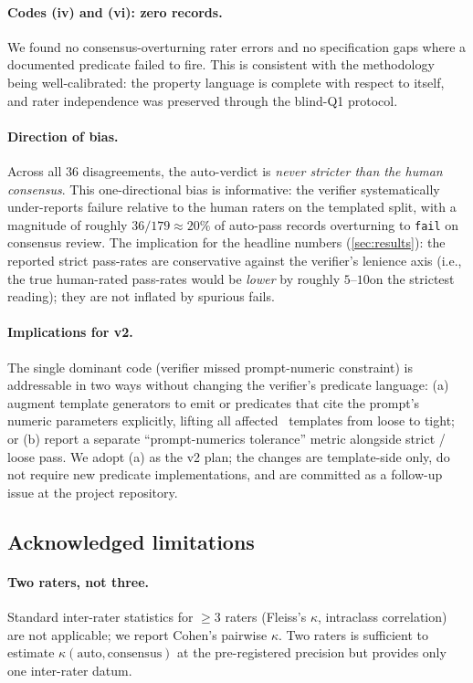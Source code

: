 \paragraph{Codes (iv) and (vi): zero records.}
We found no consensus-overturning rater errors and no specification gaps where a documented predicate failed to fire.
This is consistent with the methodology being well-calibrated: the property language is complete with respect to itself, and rater independence was preserved through the blind-Q1 protocol.

\paragraph{Direction of bias.}
Across all $36$ disagreements, the auto-verdict is \emph{never stricter than the human consensus}.
This one-directional bias is informative: the verifier systematically under-reports failure relative to the human raters on the templated split, with a magnitude of roughly $36/179 \approx 20\%$ of auto-pass records overturning to \texttt{fail} on consensus review.
The implication for the headline numbers (\cref{sec:results}): the reported strict pass-rates are conservative against the verifier's lenience axis (i.e., the true human-rated pass-rates would be \emph{lower} by roughly $5$--$10$\pp on the strictest reading); they are not inflated by spurious fails.

\paragraph{Implications for v2.}
The single dominant code (verifier missed prompt-numeric constraint) is addressable in two ways without changing the verifier's predicate language: (a) augment template generators to emit  or  predicates that cite the prompt's numeric parameters explicitly, lifting all affected \ttwo\ templates from loose to tight; or (b) report a separate ``prompt-numerics tolerance'' metric alongside strict / loose pass.
We adopt (a) as the v2 plan; the changes are template-side only, do not require new predicate implementations, and are committed as a follow-up issue at the project repository.

\subsection{Acknowledged limitations}
\label{app:human_study:limitations}

\paragraph{Two raters, not three.}
Standard inter-rater statistics for $\geq 3$ raters (Fleiss's $\kappa$, intraclass correlation) are not applicable; we report Cohen's pairwise $\kappa$.
Two raters is sufficient to estimate $\kappa(\text{auto}, \text{consensus})$ at the pre-registered precision but provides only one inter-rater datum.

